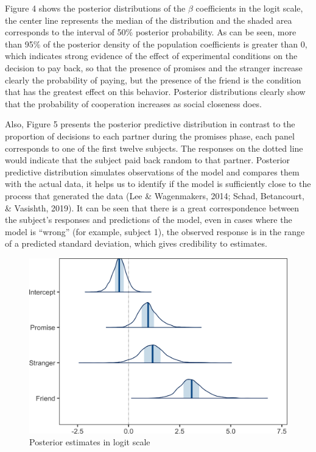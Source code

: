 \documentclass[12pt,]{article}
\begin{document}
Figure 4 shows the posterior distributions of the \(\beta\) coefficients
in the logit scale, the center line represents the median of the
distribution and the shaded area corresponds to the interval of 50\%
posterior probability. As can be seen, more than 95\% of the posterior
density of the population coefficients is greater than 0, which
indicates strong evidence of the effect of experimental conditions on
the decision to pay back, so that the presence of promises and the
stranger increase clearly the probability of paying, but the presence of
the friend is the condition that has the greatest effect on this
behavior. Posterior distributions clearly show that the probability of
cooperation increases as social closeness does.

Also, Figure 5 presents the posterior predictive distribution in
contrast to the proportion of decisions to each partner during the
promises phase, each panel corresponds to one of the first twelve
subjects. The responses on the dotted line would indicate that the
subject paid back random to that partner. Posterior predictive
distribution simulates observations of the model and compares them with
the actual data, it helps us to identify if the model is sufficiently
close to the process that generated the data (Lee \& Wagenmakers, 2014;
Schad, Betancourt, \& Vasishth, 2019). It can be seen that there is a
great correspondence between the subject's responses and predictions of
the model, even in cases where the model is ``wrong'' (for example,
subject 1), the observed response is in the range of a predicted
standard deviation, which gives credibility to estimates.

\begin{figure}

{\centering \includegraphics[width=0.8\linewidth]{article_english_files/figure-latex/fig4-1} 

}

\caption{Posterior estimates in logit scale}\label{fig:fig4}
\end{figure}
\end{document}
